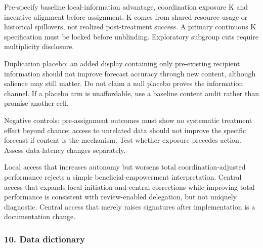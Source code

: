 \documentclass[
  11pt,
]{article}
\begin{document}
Pre-specify baseline local-information advantage, coordination exposure
K and incentive alignment before assignment. K comes from
shared-resource usage or historical spillovers, not realized
post-treatment success. A primary continuous K specification must be
locked before unblinding. Exploratory subgroup cuts require multiplicity
disclosure.

Duplication placebo: an added display containing only pre-existing
recipient information should not improve forecast accuracy through new
content, although salience may still matter. Do not claim a null placebo
proves the information channel. If a placebo arm is unaffordable, use a
baseline content audit rather than promise another cell.

Negative controls: pre-assignment outcomes must show no systematic
treatment effect beyond chance; access to unrelated data should not
improve the specific forecast if content is the mechanism. Test whether
exposure precedes action. Assess data-latency changes separately.

Local access that increases autonomy but worsens total
coordination-adjusted performance rejects a simple
beneficial-empowerment interpretation. Central access that expands local
initiation and central corrections while improving total performance is
consistent with review-enabled delegation, but not uniquely diagnostic.
Central access that merely raises signatures after implementation is a
documentation change.

\subsubsection{10. Data dictionary}\label{data-dictionary}
\end{document}

